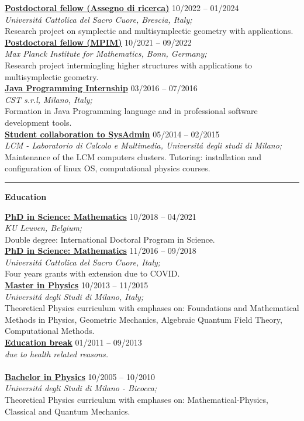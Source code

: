 \documentclass[a4paper]{article}
\newcommand{\block}[1]{\hrule \vspace{0.2cm} \textbf{\Large #1} \vspace{0.2cm}}
\newcommand{\voice}[5]{\href{#4}{\textbf{#1}} \hfill #2 \\ \textit{#3} \\ {\small #5} \vspace{0.2cm} \\}
\begin{document}
    
    \voice{Postdoctoral fellow (Assegno di ricerca)}
        {10/2022 -- 01/2024}
        {Universit\'a Cattolica del Sacro Cuore, Brescia, Italy;}
        {https://dipartimenti.unicatt.it/dmf-home}       
        {Research project on symplectic and multisymplectic geometry with applications.}
    \voice{Postdoctoral fellow (MPIM)}
        {10/2021 -- 09/2022}
        {Max Planck Institute for Mathematics, Bonn, Germany;}
        {https://www.mpim-bonn.mpg.de/}       
        {Research project intermingling higher structures with applications to multisymplectic geometry.}
    \voice{Java Programming Internship}
        {03/2016 -- 07/2016}
        {CST s.r.l, Milano, Italy;}
        {https://www.csttech.it/}       
        {Formation in Java Programming language and in professional software development tools.}
    \voice{Student collaboration to SysAdmin}
        {05/2014 -- 02/2015}
        {LCM - Laboratorio di Calcolo e Multimedia, Universit\'a degli studi di Milano;}
        {https://lcm.mi.infn.it/}       
        {Maintenance of the LCM computers clusters. Tutoring: installation and configuration of linux OS, computational physics courses.\vspace{-0.25cm}}





    \block{Education}

    
    \voice{PhD in Science: Mathematics}
        {10/2018 -- 04/2021}
        {KU Leuven, Belgium;}
        {https://web.archive.org/save/http://scuoledidottorato.unicatt.it/phdschools/science-research-projects}       
        {Double degree: International Doctoral Program in Science.}
    \voice{PhD in Science: Mathematics}
        {11/2016 -- 09/2018}
        {Universit\'a Cattolica del Sacro Cuore, Italy;}
        {https://web.archive.org/save/http://scuoledidottorato.unicatt.it/phdschools/science-research-projects}       
        {Four years grants with extension due to COVID.}
    \voice{Master in Physics}
        {10/2013 -- 11/2015}
        {Universit\'a degli Studi di Milano, Italy;}
        {}       
        {Theoretical Physics curriculum with emphases on: Foundations and Mathematical Methods in Physics, Geometric Mechanics, Algebraic Quantum Field Theory, Computational Methods.}
    \voice{Education break}
        {01/2011 -- 09/2013}
        {due to health related reasons.}
        {}       
        {\vspace{-0.25cm}}
    \voice{Bachelor in Physics}
        {10/2005 -- 10/2010}
        {Universit\'a degli Studi di Milano - Bicocca;}
        {}       
        {Theoretical Physics curriculum with emphases on: Mathematical-Physics, Classical and Quantum Mechanics.}
\end{document}
